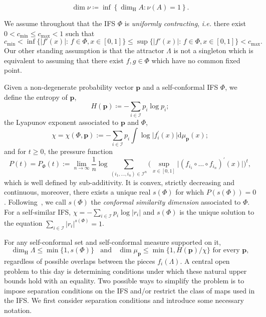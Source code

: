 \documentclass[12pt,]{article}
\theoremstyle{definition}
\theoremstyle{remark}
\newcommand{\0}{\mathbf{0}}
\newcommand{\ie}{{\it i.e.}\/ }
\begin{document}
{{\begin{equation*}
	\dim \nu\coloneqq\inf \left\{\dim_{\mathrm{H}} A: \nu(A)=1\right\} .
\end{equation*}
}


We assume throughout that the IFS $\Phi$ is \emph{uniformly contracting}, \ie there exist $0<c_{\min} \leq c_{\max}<1$ such that 
\[
c_{\min} < \inf\big\{ |f'(x)|:\, f\in\Phi, x\in[0,1] \big\} \leq \sup\big\{ |f'(x)|:\, f\in\Phi, x\in[0,1] \big\} < c_{\max}.
\]
Our other standing assumption is that the attractor $\Lambda$ is not a singleton which is equivalent to assuming that there exist $f,g\in\Phi$ which have no common fixed point. 

Given a non-degenerate probability vector $\mathbf{p}$ and a self-conformal IFS $\Phi$, we define the entropy of $\mathbf{p}$,
\begin{equation*}
H(\mathbf{p})\coloneqq -\sum_{i\in\mathcal{I}} p_i\log p_i;
\end{equation*}
the Lyapunov exponent associated to $\mathbf{p}$ and $\Phi$,
\begin{equation*}
\chi=\chi(\Phi,\mathbf{p}):=-\sum_{i \in \mathcal{I}} p_i \int \log \big|f_{i}^{'}(x)\big| \mathrm{d} \mu_{\mathbf{p}}(x);
\end{equation*}
and for $t\geq 0$, the pressure function
\begin{equation*}
P(t)=P_{\Phi}(t):=\lim _{n \rightarrow \infty} \frac{1}{n} \log \sum_{(i_1,\ldots,i_n) \in \mathcal{I}^n} \Big(\sup_{x\in[0,1]} \big|(f_{i_1}\circ \dots \circ f_{i_n})^{\prime}(x)\big|\Big)^t,
\end{equation*}
which is well defined by sub-additivity. It is convex, strictly decreasing and continuous, moreover, there exists a unique real $s(\Phi)$ for which $P(s(\Phi))=0$. Following~\cite[Chapter~14]{BaranySimonSolomyak_Book23}, we call $s(\Phi)$ the \emph{conformal similarity dimension} associated to $\Phi$. For a self-similar IFS, $\chi=-\sum_{i \in \mathcal{I}}p_i\log |r_i|$ and $s(\Phi)$ is the unique solution to the equation $\sum_{i \in \mathcal{I}}|r_i|^{s(\Phi)}=1$.

For any self-conformal set and self-conformal measure supported on it, 
\begin{equation}\label{eq:DimUpperBound}
\dim_{\mathrm{H}} \Lambda \leq \min\{1,s(\Phi)\}  \;\;\text{ and }\;\; \dim \mu_{\mathbf{p}} \leq \min\{1, H(\mathbf{p})/\chi\} \text{ for every } \mathbf{p},
\end{equation} 
regardless of possible overlaps between the pieces $f_i(\Lambda)$. A central open problem to this day is determining conditions under which these natural upper bounds hold with an equality. Two possible ways to simplify the problem is to impose separation conditions on the IFS and/or restrict the class of maps used in the IFS. We first consider separation conditions and introduce some necessary notation.


}
\end{document}
